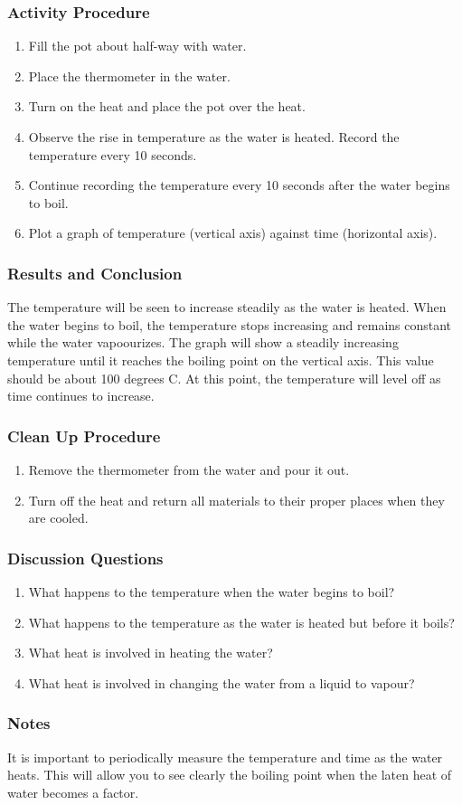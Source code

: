 \subsubsection*{Activity Procedure}
\begin{enumerate}
\item{Fill the pot about half-way with water.} 
\item{Place the thermometer in the water.} 
\item{Turn on the heat and place the pot over the heat.} 
\item{Observe the rise in temperature as the water is heated. Record the temperature every 10 seconds.} 
\item{Continue recording the temperature every 10 seconds after the water begins to boil.} 
\item{Plot a graph of temperature (vertical axis) against time (horizontal axis).} 
\end{enumerate}

\subsubsection*{Results and Conclusion}
The temperature will be seen to increase steadily as the water is heated. When the water begins to boil, the temperature stops increasing and remains constant while the water vapoourizes. The graph will show a steadily increasing temperature until it reaches the boiling point on the vertical axis. This value should be about 100 degrees C. At this point, the temperature will level off as time continues to increase.  

\subsubsection*{Clean Up Procedure}
\begin{enumerate}
\item{Remove the thermometer from the water and pour it out.} 
\item{Turn off the heat and return all materials to their proper places when they are cooled.} 
\end{enumerate}

\subsubsection*{Discussion Questions}
\begin{enumerate}
\item{What happens to the temperature when the water begins to boil?}
\item{What happens to the temperature as the water is heated but before it boils?}
\item{What heat is involved in heating the water?}
\item{What heat is involved in changing the water from a liquid to vapour?}
\end{enumerate}

\subsubsection*{Notes}
It is important to periodically measure the temperature and time as the water heats.  This will allow you to see clearly the boiling point when the laten heat of water becomes a factor.
